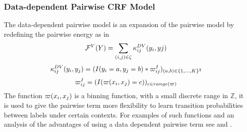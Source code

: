\subsubsection{Data-dependent Pairwise CRF Model}\label{sec:dataDep}
The data-dependent pairwise model is an expansion of the pairwise model by redefining the pairwise energy as in 
\begin{align}
 \mathcal{F}^V(Y) = \sum_{(i,j) \in \zeta} \kappa^{DV}_{i j}(y_i,yj)  \label{sec:dataDep}
 \end{align}
\begin{align}
  \crfFeatMap^{DV}_{i j}(y_i,y_j) = (I(y_i = a, y_j = b) * \dataDepFn^I_{i j} )_{(a,b) \in \{ 1,...,K\}^2}   %
\end{align} 
\begin{align}
\varpi^I_{i j} =  (I(\varpi(x_i,x_j)=c))_{c \in range(\varpi)}
\end{align}
The function $\varpi(x_i,x_j)$ is a binning function, with a small discrete range in $\mathbb{Z}$, it is used to give the pairwise term more flexibility to learn transition probabilities between labels under certain contexts. For examples of such functions and an analysis of the advantages of using a data dependent pairwise term see \cite{dataDepPaper1} and \cite{dataDepPaper2}.
